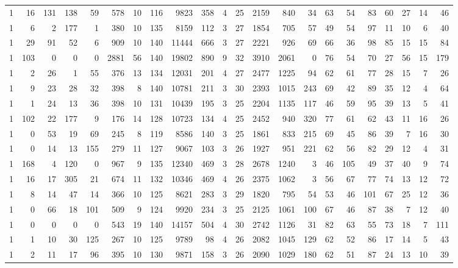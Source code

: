 {\begin{landscape}
\begin{longtable}[c]{lrrrrrrrrrrrrrrrrrrrrr}
1 & 16 & 131 & 138 & 59 & 578 & 10 & 116 & 9823 & 358 & 4 & 25 & 2159 & 840 & 34 & 63 & 54 & 83 & 60 & 27 & 14 & 46 \\
1 & 6 & 2 & 177 & 1 & 380 & 10 & 135 & 8159 & 112 & 3 & 27 & 1854 & 705 & 57 & 49 & 54 & 97 & 11 & 10 & 6 & 40 \\
1 & 29 & 91 & 52 & 6 & 909 & 10 & 140 & 11444 & 666 & 3 & 27 & 2221 & 926 & 69 & 66 & 36 & 98 & 85 & 15 & 15 & 84 \\
1 & 103 & 0 & 0 & 0 & 2881 & 56 & 140 & 19802 & 890 & 9 & 32 & 3910 & 2061 & 0 & 76 & 54 & 70 & 27 & 56 & 15 & 179 \\
1 & 2 & 26 & 1 & 55 & 376 & 13 & 134 & 12031 & 201 & 4 & 27 & 2477 & 1225 & 94 & 62 & 61 & 77 & 28 & 15 & 7 & 26 \\
1 & 9 & 23 & 28 & 32 & 398 & 8 & 140 & 10781 & 211 & 3 & 30 & 2393 & 1015 & 243 & 69 & 42 & 89 & 35 & 12 & 4 & 64 \\
1 & 1 & 24 & 13 & 36 & 398 & 10 & 131 & 10439 & 195 & 3 & 25 & 2204 & 1135 & 117 & 46 & 59 & 95 & 39 & 13 & 5 & 41 \\
1 & 102 & 22 & 177 & 9 & 176 & 14 & 128 & 10723 & 134 & 4 & 25 & 2452 & 940 & 320 & 77 & 61 & 62 & 43 & 11 & 16 & 26 \\
1 & 0 & 53 & 19 & 69 & 245 & 8 & 119 & 8586 & 140 & 3 & 25 & 1861 & 833 & 215 & 69 & 45 & 86 & 39 & 7 & 16 & 30 \\
1 & 0 & 14 & 13 & 155 & 279 & 11 & 127 & 9067 & 103 & 3 & 26 & 1927 & 951 & 221 & 62 & 56 & 82 & 29 & 12 & 4 & 31 \\
1 & 168 & 4 & 120 & 0 & 967 & 9 & 135 & 12340 & 469 & 3 & 28 & 2678 & 1240 & 3 & 46 & 105 & 49 & 37 & 40 & 9 & 74 \\
1 & 16 & 17 & 305 & 21 & 674 & 11 & 132 & 10346 & 469 & 4 & 26 & 2375 & 1062 & 3 & 56 & 67 & 77 & 74 & 13 & 12 & 72 \\
1 & 8 & 14 & 47 & 14 & 366 & 10 & 125 & 8621 & 283 & 3 & 29 & 1820 & 795 & 54 & 53 & 46 & 101 & 67 & 25 & 12 & 36 \\
1 & 0 & 66 & 18 & 101 & 509 & 9 & 124 & 9920 & 234 & 3 & 25 & 2125 & 1061 & 100 & 67 & 46 & 87 & 38 & 7 & 12 & 40 \\
1 & 0 & 0 & 0 & 0 & 543 & 19 & 140 & 14157 & 504 & 4 & 30 & 2742 & 1126 & 31 & 82 & 63 & 55 & 73 & 18 & 7 & 111 \\
1 & 1 & 10 & 30 & 125 & 267 & 10 & 125 & 9789 & 98 & 4 & 26 & 2082 & 1045 & 129 & 62 & 52 & 86 & 17 & 14 & 5 & 43 \\
1 & 2 & 11 & 17 & 96 & 395 & 10 & 130 & 9871 & 158 & 3 & 26 & 2090 & 1029 & 180 & 62 & 51 & 87 & 24 & 13 & 10 & 39 \\

\end{longtable}
\end{landscape}}
